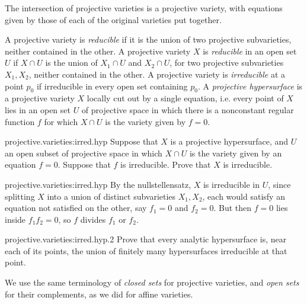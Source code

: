 \begin{example}
The intersection of projective varieties is a projective variety, with equations given by those of each of the original varieties put together.
\end{example}
A projective variety is \emph{reducible} if it is the union of two projective subvarieties, neither contained in the other.
A projective variety \(X\) is \emph{reducible} in an open set \(U\) if \(X\cap U\) is the union of \(X_1\cap U\) and \(X_2\cap U\), for two projective subvarieties \(X_1,X_2\), neither contained in the other.
A projective variety is \emph{irreducible} at a point \(p_0\) if irreducible in every open set containing \(p_0\).
A \emph{projective hypersurface} is a projective variety \(X\) locally cut out by a single equation, i.e. every point of \(X\) lies in an open set \(U\) of projective space in which there is a nonconstant regular function \(f\) for which \(X\cap U\) is the variety given by \(f=0\).
\begin{problem}{projective.varieties:irred.hyp}
Suppose that \(X\) is a projective hypersurface, and \(U\) an open subset of projective space in which \(X\cap U\) is the variety given by an equation \(f=0\).
Suppose that \(f\) is irreducible.
Prove that \(X\) is irreducible.
\end{problem}
\begin{answer}{projective.varieties:irred.hyp}
By the nullstellensatz, \(X\) is irreducible in \(U\), since splitting \(X\) into a union of distinct subvarieties \(X_1,X_2\), each would satisfy an equation not satisfied on the other, say \(f_1=0\) and \(f_2=0\).
But then \(f=0\) lies inside \(f_1f_2=0\), so \(f\) divides \(f_1\) or \(f_2\).
\end{answer}
\begin{problem}{projective.varieties:irred.hyp.2}
Prove that every analytic hypersurface is, near each of its points, the union of finitely many  hypersurfaces irreducible at that point.
\end{problem}
We use the same terminology of \emph{closed sets} for projective varieties, and \emph{open sets} for their complements, as we did for affine varieties.


